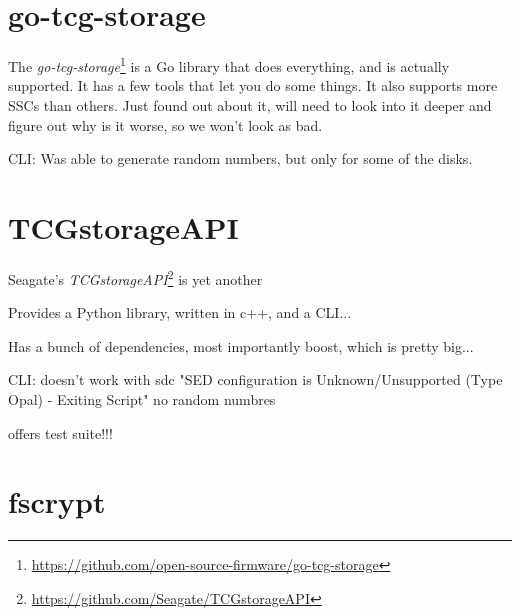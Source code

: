 


\section{go-tcg-storage}

The \emph{go-tcg-storage}\footnote{\url{https://github.com/open-source-firmware/go-tcg-storage}} is a Go library that does everything, and is actually supported. It has a few tools that let you do some things. It also supports more SSCs than others. Just found out about it, will need to look into it deeper and figure out why is it worse, so we won't look as bad.

CLI: Was able to generate random numbers, but only for some of the disks.

\section{TCGstorageAPI}

Seagate's \emph{TCGstorageAPI}\footnote{\url{https://github.com/Seagate/TCGstorageAPI}} is yet another 

Provides a Python library, written in c++, and a CLI...

Has a bunch of dependencies, most importantly boost, which is pretty big...

CLI: doesn't work with sdc "SED configuration is Unknown/Unsupported (Type Opal) - Exiting Script"
no random numbres

offers test suite!!!

\section{fscrypt}

